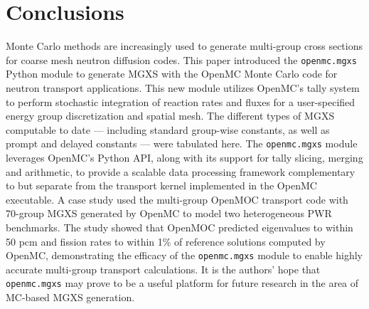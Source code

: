 \section{Conclusions}
\label{sec:conclusions}

Monte Carlo methods are increasingly used to generate multi-group cross sections for coarse mesh neutron diffusion codes. This paper introduced the \texttt{openmc.mgxs} Python module to generate MGXS with the OpenMC Monte Carlo code for neutron transport applications. This new module utilizes OpenMC's tally system to perform stochastic integration of reaction rates and fluxes for a user-specified energy group discretization and spatial mesh. The different types of MGXS computable to date --- including standard group-wise constants, as well as prompt and delayed constants --- were tabulated here. The \texttt{openmc.mgxs} module leverages OpenMC's Python API, along with its support for tally slicing, merging and arithmetic, to provide a scalable data processing framework complementary to but separate from the transport kernel implemented in the OpenMC executable. A case study used the multi-group OpenMOC transport code with 70-group MGXS generated by OpenMC to model two heterogeneous PWR benchmarks. The study showed that OpenMOC predicted eigenvalues to within 50 pcm and fission rates to within 1\% of reference solutions computed by OpenMC, demonstrating the efficacy of the \texttt{openmc.mgxs} module to enable highly accurate multi-group transport calculations. It is the authors' hope that \texttt{openmc.mgxs} may prove to be a useful platform for future research in the area of MC-based MGXS generation.

